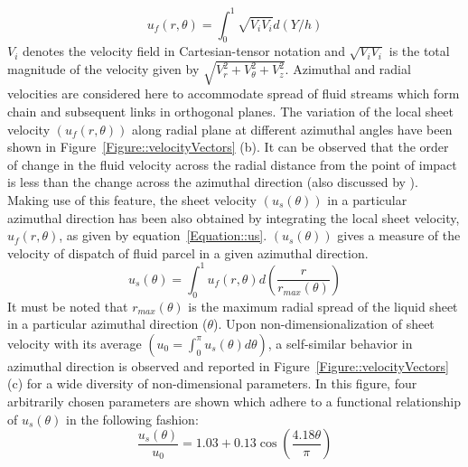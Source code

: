 \begin{equation}\label{Equation::uf}
u_f(r,\theta) = \int_{0}^{1}\sqrt{V_iV_i}d(Y/h)
\end{equation}
$V_i$ denotes the velocity field in Cartesian-tensor notation and $\sqrt{V_iV_i}$ is the total magnitude of the velocity given by $\sqrt{V_r^2 + V_\theta^2 + V_z^2}$. Azimuthal and radial velocities are considered here to accommodate spread of fluid streams which form chain and subsequent links in orthogonal planes. The variation of the local sheet velocity $\left(u_f(r,\theta)\right)$ along radial plane at different azimuthal angles have been shown in Figure~\ref{Figure::velocityVectors} (b). It can be observed that the order of change in the fluid velocity across the radial distance from the point of impact is less than the change across the azimuthal direction (also discussed by \citet{choo2002velocity}). Making use of this feature, the sheet velocity $\left(u_s(\theta)\right)$ in a particular azimuthal direction has been also obtained by integrating the local sheet velocity, $u_f(r,\theta)$, as given by equation~\ref{Equation::us}. $\left(u_s(\theta)\right)$ gives a measure of the velocity of dispatch of fluid parcel in a given azimuthal direction.
\begin{equation}\label{Equation::us}
u_s(\theta) = \int_{0}^{1}u_f(r,\theta)d\left(\frac{r}{r_{max}(\theta)}\right)
\end{equation} 
It must be noted that $r_{max}(\theta)$ is the maximum radial spread of the liquid sheet in a particular azimuthal direction ($\theta$). Upon non-dimensionalization of sheet velocity with its average $\left(u_0 = \int_{0}^{\pi}u_s(\theta)d\theta\right)$, a self-similar behavior in azimuthal direction is observed and reported in Figure~\ref{Figure::velocityVectors} (c) for a wide diversity of non-dimensional parameters. In this figure, four arbitrarily chosen parameters are shown which adhere to a functional relationship of $u_s(\theta)$ in the following fashion: 
\begin{equation}\label{Equation::usu0}
\frac{u_s(\theta)}{u_0} = 1.03 + 0.13\cos\left(\frac{4.18\theta}{\pi}\right)
\end{equation}
